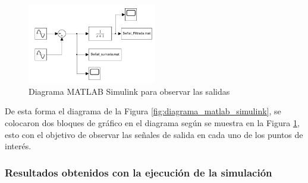 \begin{figure}[h!]
    \centering
    \includegraphics[width=0.5\textwidth]{fig/especifico_2/CASO_ESTUDIO_FILTRO/Diagrama matlab simulink scope.pdf}
    \caption{Diagrama MATLAB Simulink para  observar las salidas}
    \label{fig:diagrama_matlab_simulink_graficos}
\end{figure}

De esta forma el diagrama de la Figura \ref{fig:diagrama_matlab_simulink}, se colocaron dos bloques de gráfico en el diagrama según se muestra en la Figura \ref{fig:diagrama_matlab_simulink_graficos}, esto con el objetivo de  observar las señales de salida en cada uno de los puntos de interés.


\newpage

\subsubsection{Resultados obtenidos con la ejecución de la simulación}


